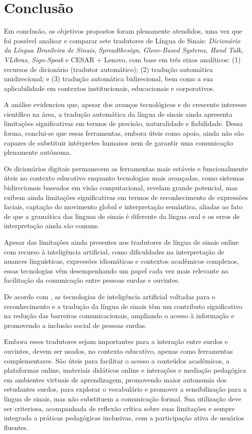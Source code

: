 \documentclass[portuguese]{textolivre}
\begin{document}
\section{Conclusão}\label{sec-conclusao}
Em conclusão, os objetivos propostos foram plenamente atendidos, uma vez que foi possível analisar e comparar sete tradutores de Língua de Sinais: \textit{Dicionário da Língua Brasileira de Sinais},  \textit{Spreadthesign, Glove-Based Systems, Hand Talk, VLibras, Sign-Speak} e CESAR + Lenovo, com base em três eixos analíticos: (1) recursos de dicionário (tradutor automático); (2) tradução automática unidirecional; e (3) tradução automática bidirecional, bem como a sua aplicabilidade em contextos institucionais, educacionais e corporativos.

A análise evidenciou que, apesar dos avanços tecnológicos e do crescente interesse científico na área, a tradução automática da língua de sinais ainda apresenta limitações significativas em termos de precisão, naturalidade e fiabilidade. Dessa forma, conclui-se que essas ferramentas, embora úteis como apoio, ainda não são capazes de substituir intérpretes humanos nem de garantir uma comunicação plenamente autônoma.

Os dicionários digitais permanecem as ferramentas mais estáveis e funcionalmente úteis no contexto educativo enquanto tecnologias mais avançadas, como sistemas bidirecionais baseados em visão computacional, revelam grande potencial, mas exibem ainda limitações significativas em termos de reconhecimento de expressões faciais, captação do movimento global e interpretação semântica, aliadas ao fato de que a gramática das línguas de sinais é diferente da língua oral e os erros de interpretação ainda são comuns.

Apesar das limitações ainda presentes nos tradutores de língua de sinais online com recurso à inteligência artificial, como dificuldades na interpretação de nuances linguísticas, expressões idiomáticas e contextos acadêmicos complexos, essas tecnologias vêm desempenhando um papel cada vez mais relevante na facilitação da comunicação entre pessoas surdas e ouvintes.

De acordo com \textcite{PapastratisEtAl2021}, as tecnologias de inteligência artificial voltadas para o reconhecimento e a tradução da língua de sinais têm um contributo significativo na redução das barreiras comunicacionais, ampliando o acesso à informação e promovendo a inclusão social de pessoas surdas.

Embora esses tradutores sejam importantes para a interação entre surdos e ouvintes, devem ser usados, no contexto educativo, apenas como ferramentas complementares. São úteis para facilitar o acesso a conteúdos acadêmicos, a plataformas online, materiais didáticos online e interações e mediação pedagógica em ambientes virtuais de aprendizagem, promovendo maior autonomia dos estudantes surdos, para explorar o vocabulário e promover a sensibilização para a língua de sinais, mas não substituem a comunicação formal. Sua utilização deve ser criteriosa, acompanhada de reflexão crítica sobre suas limitações e sempre integrada a práticas pedagógicas inclusivas, com a participação ativa de usuários fluentes.
\end{document}
